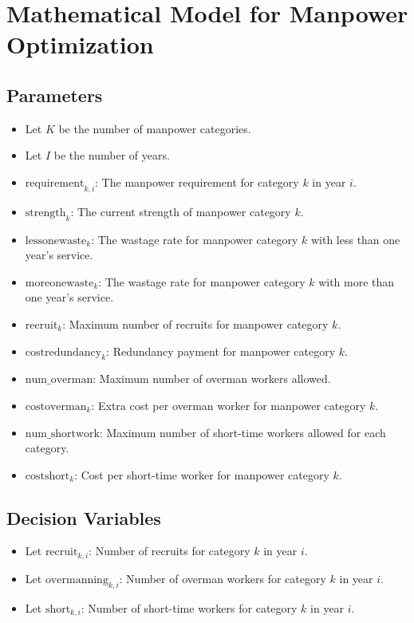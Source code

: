 \documentclass{article}
\begin{document}
\section*{Mathematical Model for Manpower Optimization}

\subsection*{Parameters}
\begin{itemize}
    \item Let \( K \) be the number of manpower categories.
    \item Let \( I \) be the number of years.
    \item \( \text{requirement}_{k,i} \): The manpower requirement for category \( k \) in year \( i \).
    \item \( \text{strength}_{k} \): The current strength of manpower category \( k \).
    \item \( \text{lessonewaste}_{k} \): The wastage rate for manpower category \( k \) with less than one year's service.
    \item \( \text{moreonewaste}_{k} \): The wastage rate for manpower category \( k \) with more than one year's service.
    \item \( \text{recruit}_{k} \): Maximum number of recruits for manpower category \( k \).
    \item \( \text{costredundancy}_{k} \): Redundancy payment for manpower category \( k \).
    \item \( \text{num\_overman} \): Maximum number of overman workers allowed.
    \item \( \text{costoverman}_{k} \): Extra cost per overman worker for manpower category \( k \).
    \item \( \text{num\_shortwork} \): Maximum number of short-time workers allowed for each category.
    \item \( \text{costshort}_{k} \): Cost per short-time worker for manpower category \( k \).
\end{itemize}

\subsection*{Decision Variables}
\begin{itemize}
    \item Let \( \text{recruit}_{k,i} \): Number of recruits for category \( k \) in year \( i \).
    \item Let \( \text{overmanning}_{k,i} \): Number of overman workers for category \( k \) in year \( i \).
    \item Let \( \text{short}_{k,i} \): Number of short-time workers for category \( k \) in year \( i \).
\end{itemize}
\end{document}
